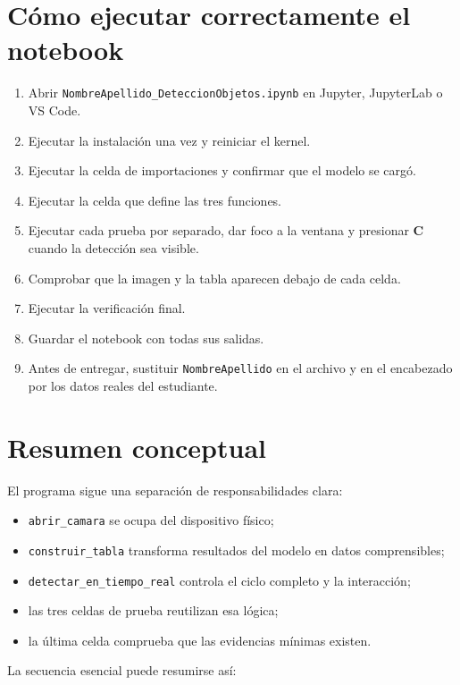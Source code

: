 \documentclass[11pt,a4paper]{article}
\newcommand{\archivo}[1]{\nolinkurl{#1}}
\begin{document}
\section{Cómo ejecutar correctamente el notebook}

\begin{enumerate}
  \item Abrir \archivo{NombreApellido_DeteccionObjetos.ipynb} en Jupyter,
  JupyterLab o VS Code.
  \item Ejecutar la instalación una vez y reiniciar el kernel.
  \item Ejecutar la celda de importaciones y confirmar que el modelo se cargó.
  \item Ejecutar la celda que define las tres funciones.
  \item Ejecutar cada prueba por separado, dar foco a la ventana y presionar
  \textbf{C} cuando la detección sea visible.
  \item Comprobar que la imagen y la tabla aparecen debajo de cada celda.
  \item Ejecutar la verificación final.
  \item Guardar el notebook con todas sus salidas.
  \item Antes de entregar, sustituir \texttt{NombreApellido} en el archivo y
  en el encabezado por los datos reales del estudiante.
\end{enumerate}

\section{Resumen conceptual}

El programa sigue una separación de responsabilidades clara:

\begin{itemize}
  \item \texttt{abrir\_camara} se ocupa del dispositivo físico;
  \item \texttt{construir\_tabla} transforma resultados del modelo en datos
  comprensibles;
  \item \texttt{detectar\_en\_tiempo\_real} controla el ciclo completo y la
  interacción;
  \item las tres celdas de prueba reutilizan esa lógica;
  \item la última celda comprueba que las evidencias mínimas existen.
\end{itemize}

La secuencia esencial puede resumirse así:
\end{document}

